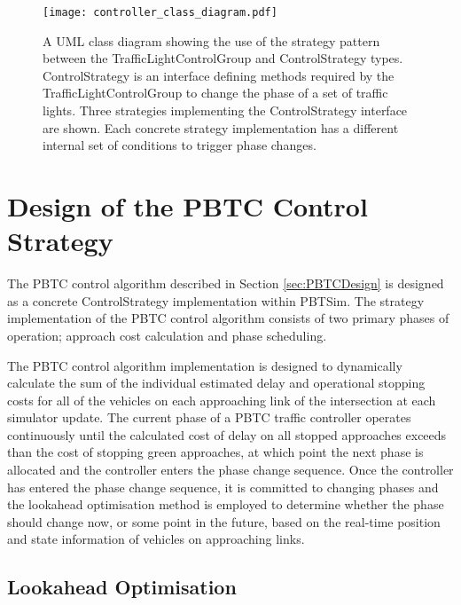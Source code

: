 \begin{figure}[]
\centering
	\texttt{[image: controller\_class\_diagram.pdf]}
	\caption[A UML class diagram of the PBTSim application architecture.]{ A UML class diagram showing the use of the strategy pattern between the TrafficLightControlGroup and ControlStrategy types. ControlStrategy is an interface defining methods required by the TrafficLightControlGroup to change the phase of a set of traffic lights. Three strategies implementing the ControlStrategy interface are shown. Each concrete strategy implementation has a different internal set of conditions to trigger phase changes. }
\label{controllerclassdiagram}
\end{figure}


\section{Design of the PBTC Control Strategy}

The PBTC control algorithm described in Section \ref{sec:PBTCDesign} is designed as a concrete ControlStrategy implementation within PBTSim. The strategy implementation of the PBTC control algorithm consists of two primary phases of operation; approach cost calculation and phase scheduling. 

The PBTC control algorithm implementation is designed to dynamically calculate the sum of the individual estimated delay and operational stopping costs for all of the vehicles on each approaching link of the intersection at each simulator update. The current phase of a PBTC traffic controller operates continuously until the calculated cost of delay on all stopped approaches exceeds than the cost of stopping green approaches, at which point the next phase is allocated and the controller enters the phase change sequence. Once the controller has entered the phase change sequence, it is  committed to changing phases and the lookahead optimisation method is employed to determine whether the phase should change now, or some point in the future, based on the real-time position and state information of vehicles on approaching links. 

\subsection{Lookahead Optimisation}

